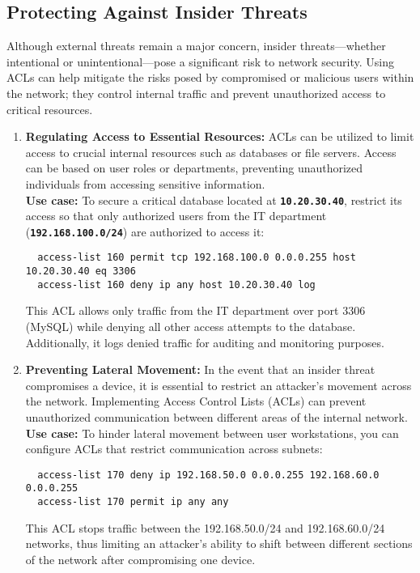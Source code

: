 \documentclass[11pt,a4paper]{article}
\begin{document}
    \subsection*{Protecting Against Insider Threats}
    Although external threats remain a major concern, insider threats—whether intentional or unintentional—pose a significant risk to network security. Using ACLs can help mitigate the risks posed by compromised or malicious users within the network; they control internal traffic and prevent unauthorized access to critical resources.

        \begin{enumerate}
            \item \textbf{Regulating Access to Essential Resources:} ACLs can be utilized to limit access to crucial internal resources such as databases or file servers. Access can be based on user roles or departments, preventing unauthorized individuals from accessing sensitive information.
            \\[1em]
            \textbf{Use case:} To secure a critical database located at \textbf{\lstinline{10.20.30.40}}, restrict its access so that only authorized users from the IT department (\textbf{\lstinline{192.168.100.0/24}}) are authorized to access it:
\begin{lstlisting}
  access-list 160 permit tcp 192.168.100.0 0.0.0.255 host 10.20.30.40 eq 3306
  access-list 160 deny ip any host 10.20.30.40 log                            
\end{lstlisting}
            This ACL allows only traffic from the IT department over port 3306 (MySQL) while denying all other access attempts to the database. Additionally, it logs denied traffic for auditing and monitoring purposes.

            \item \textbf{Preventing Lateral Movement:} In the event that an insider threat compromises a device, it is essential to restrict an attacker’s movement across the network. Implementing Access Control Lists (ACLs) can prevent unauthorized communication between different areas of the internal network.
            \\[1em]
            \textbf{Use case:} To hinder lateral movement between user workstations, you can configure ACLs that restrict communication across subnets:
\begin{lstlisting}
  access-list 170 deny ip 192.168.50.0 0.0.0.255 192.168.60.0 0.0.0.255
  access-list 170 permit ip any any                            
\end{lstlisting}
            This ACL stops traffic between the 192.168.50.0/24 and 192.168.60.0/24 networks, thus limiting an attacker’s ability to shift between different sections of the network after compromising one device.


\end{enumerate}
\end{document}
